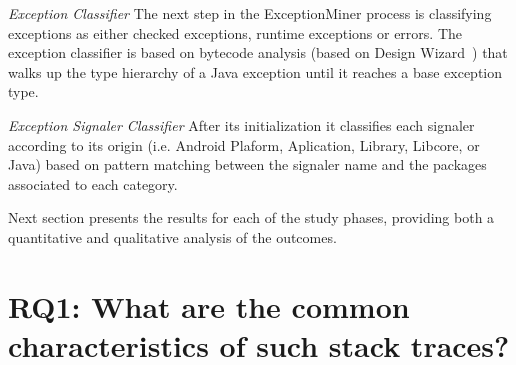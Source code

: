 \documentclass[conference]{IEEEtran}
\begin{document}

\noindent\emph{Exception Classifier} The next step in the ExceptionMiner process
is classifying exceptions as either checked exceptions, runtime exceptions or 
errors. The exception classifier is based on bytecode analysis (based on Design
Wizard~\cite{Brunet09}) that walks up the type hierarchy of a Java exception
until it reaches a base exception type.

\noindent\emph{Exception Signaler Classifier} After its initialization it
classifies each signaler according to its origin (i.e. Android Plaform,
Aplication, Library, Libcore, or Java) based on pattern matching between the
signaler name and the packages associated to each category.

Next section presents the results for each of the study phases, providing both a
quantitative and qualitative analysis of the outcomes.




\section{RQ1: What are the common characteristics of such stack traces?}

\end{document}
